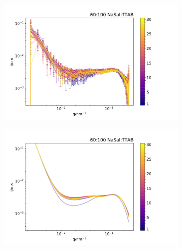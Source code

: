 \begin{figure}[h]
    \begin{subfigure}[t]{0.5\textwidth}
        \centering
        \includegraphics[width=\textwidth]{imagens/saxs/TR_saxs_60_100_3_dados.pdf}
        \caption{}
        \label{fig:saxs_tr_}
    \end{subfigure}%
    \begin{subfigure}[t]{0.5\textwidth}
        \centering
        \includegraphics[width=\textwidth]{imagens/saxs/TR_saxs_60_100_3_ajustes.pdf}
        \caption{}
        \label{fig:saxs_tr_}
    \end{subfigure}
    \caption{}
    \label{fig:}
\end{figure} 


